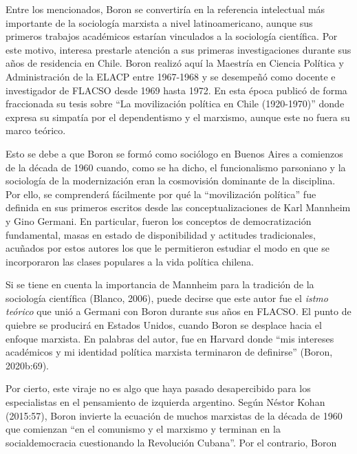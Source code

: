 Entre los mencionados, Boron se convertiría en la referencia intelectual más importante de la sociología marxista a nivel latinoamericano, aunque sus primeros trabajos académicos estarían vinculados a la sociología científica. Por este motivo, interesa prestarle atención a sus primeras investigaciones durante sus años de residencia en Chile. Boron realizó aquí la Maestría en Ciencia Política y Administración de la ELACP entre 1967-1968 y se desempeñó como docente e investigador de FLACSO desde 1969 hasta 1972. En esta época publicó de forma fraccionada su tesis sobre \enquote{La movilización política en Chile (1920-1970)} donde expresa su simpatía por el dependentismo y el marxismo, aunque este no fuera su marco teórico.

Esto se debe a que Boron se formó como sociólogo en Buenos Aires a comienzos de la década de 1960 cuando, como se ha dicho, el funcionalismo parsoniano y la sociología de la modernización eran la cosmovisión dominante de la disciplina. Por ello, se comprenderá fácilmente por qué la \enquote{movilización política} fue definida en sus primeros escritos desde las conceptualizaciones de Karl Mannheim y Gino Germani. En particular, fueron los conceptos de democratización fundamental, masas en estado de disponibilidad y actitudes tradicionales, acuñados por estos autores los que le permitieron estudiar el modo en que se incorporaron las clases populares a la vida política chilena.

Si se tiene en cuenta la importancia de Mannheim para la tradición de la sociología científica \parencite{278-AMARAL2018,1504-VILA2023}(Blanco, 2006), puede decirse que este autor fue el \emph{istmo teórico} que unió a Germani con Boron durante sus años en FLACSO. El punto de quiebre se producirá en Estados Unidos, cuando Boron se desplace hacia el enfoque marxista. En palabras del autor, fue en Harvard donde \enquote{mis intereses académicos y mi identidad política marxista terminaron de definirse} (Boron, 2020b:69).

Por cierto, este viraje no es algo que haya pasado desapercibido para los especialistas en el pensamiento de izquierda argentino. Según Néstor Kohan (2015:57), Boron invierte la ecuación de muchos marxistas de la década de 1960 que comienzan \enquote{en el comunismo y el marxismo y terminan en la socialdemocracia cuestionando la Revolución Cubana}. Por el contrario, Boron

